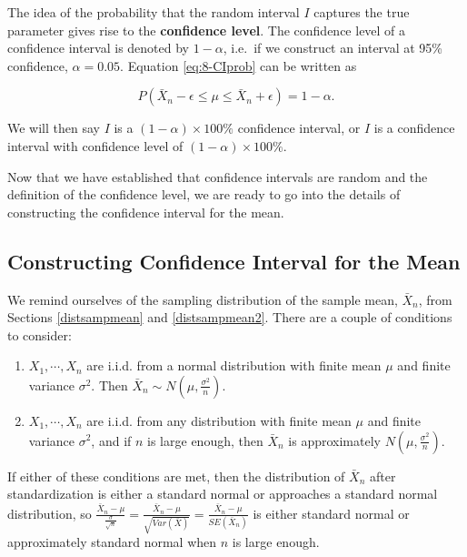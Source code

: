 \documentclass[
]{book}
\theoremstyle{definition}
\theoremstyle{definition}
\theoremstyle{definition}
\theoremstyle{definition}
\theoremstyle{remark}
\begin{document}
The idea of the probability that the random interval \(I\) captures the true parameter gives rise to the \textbf{confidence level}. The confidence level of a confidence interval is denoted by \(1-\alpha\), i.e.~if we construct an interval at 95\% confidence, \(\alpha=0.05\). Equation \eqref{eq:8-CIprob} can be written as

\begin{equation} 
P(\bar{X}_n - \epsilon \leq \mu \leq \bar{X}_n + \epsilon) = 1 - \alpha.
\label{eq:8-CIalpha}
\end{equation}

We will then say \(I\) is a \((1-\alpha) \times 100\%\) confidence interval, or \(I\) is a confidence interval with confidence level of \((1-\alpha) \times 100\%\).

Now that we have established that confidence intervals are random and the definition of the confidence level, we are ready to go into the details of constructing the confidence interval for the mean.

\hypertarget{constructing-confidence-interval-for-the-mean}{%
\subsection{Constructing Confidence Interval for the Mean}\label{constructing-confidence-interval-for-the-mean}}

We remind ourselves of the sampling distribution of the sample mean, \(\bar{X}_n\), from Sections \ref{distsampmean} and \ref{distsampmean2}. There are a couple of conditions to consider:

\begin{enumerate}
\def\labelenumi{\arabic{enumi}.}
\item
  \(X_1, \cdots, X_n\) are i.i.d. from a normal distribution with finite mean \(\mu\) and finite variance \(\sigma^2\). Then \(\bar{X}_n \sim N(\mu, \frac{\sigma^2}{n})\).
\item
  \(X_1, \cdots, X_n\) are i.i.d. from any distribution with finite mean \(\mu\) and finite variance \(\sigma^2\), and if \(n\) is large enough, then \(\bar{X}_n\) is approximately \(N(\mu, \frac{\sigma^2}{n})\).
\end{enumerate}

If either of these conditions are met, then the distribution of \(\bar{X}_n\) after standardization is either a standard normal or approaches a standard normal distribution, so \(\frac{\bar{X}_n - \mu}{\frac{\sigma}{\sqrt{n}}} = \frac{\bar{X}_n - \mu}{\sqrt{Var(\bar{X})}} = \frac{\bar{X}_n - \mu}{SE(\bar{X}_n)}\) is either standard normal or approximately standard normal when \(n\) is large enough.
\end{document}
